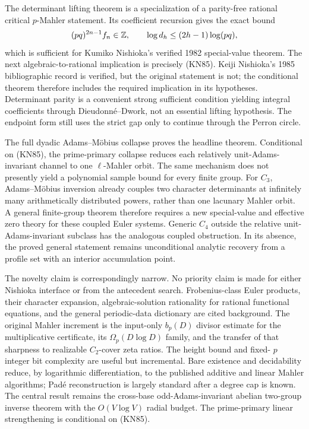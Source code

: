 The determinant lifting theorem is a specialization of a parity-free rational
critical \(p\)-Mahler statement.  Its coefficient recursion gives the exact
bound
\[
 (pq)^{2n-1}f_n\in\mathbb{Z},\qquad
 \log d_h\le(2h-1)\log(pq),
\]
which is sufficient for Kumiko Nishioka's verified 1982 special-value
theorem.  The next algebraic-to-rational implication is precisely
\textup{(KN85)}.  Keiji Nishioka's 1985 bibliographic record is verified, but
the original statement is not; the conditional theorem therefore includes
the required implication in its hypotheses.  Determinant parity is a convenient strong
sufficient condition yielding integral coefficients through
Dieudonn\'e--Dwork, not an essential lifting hypothesis.  The endpoint form
still uses the strict gap only to continue through the Perron circle.

The full dyadic Adams--M\"obius collapse proves the headline theorem.
Conditional on \textup{(KN85)}, the prime-primary collapse reduces each
relatively unit-Adams-invariant channel to one \(\ell\)-Mahler orbit.  The
same mechanism does not presently
yield a polynomial sample
bound for every finite group.  For \(C_3\), Adams--M\"obius inversion already couples
two character determinants at infinitely many arithmetically distributed
powers, rather than one lacunary Mahler orbit.  A general finite-group theorem
therefore requires a new special-value and effective zero theory for these
coupled Euler systems.  Generic \(C_4\) outside the relative unit-Adams-invariant
subclass has the analogous coupled obstruction.  In its absence, the proved
general statement remains unconditional analytic recovery from a profile set
with an interior accumulation point.

The novelty claim is correspondingly narrow.  No priority claim is made for
either Nishioka interface or from the antecedent search.
Frobenius-class Euler products, their character expansion,
algebraic-solution rationality for rational functional equations, and the
general periodic-data dictionary are cited background.  The original Mahler
increment is the input-only \(b_p(D)\) divisor estimate for the multiplicative
certificate, its \(\Omega_p(D\log D)\) family, and the transfer of that
sharpness to realizable \(C_2\)-cover zeta ratios.  The height bound and fixed-
\(p\) integer bit complexity are useful but incremental.  Bare existence and
decidability reduce, by logarithmic differentiation, to the published
additive and linear Mahler algorithms; Pad\'e reconstruction is largely
standard after a degree cap is known.  The central result remains the
cross-base odd-Adams-invariant abelian two-group inverse theorem with the
\(O(V\log V)\) radial budget.  The prime-primary linear strengthening is
conditional on \textup{(KN85)}.

